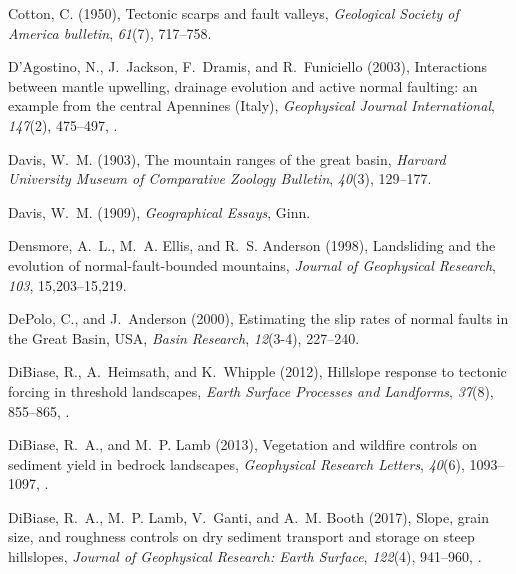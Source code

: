 \begin{thebibliography}{50}
Cotton, C. (1950), Tectonic scarps and fault valleys, \textit{Geological
  Society of America bulletin}, \textit{61}(7), 717--758.

D'Agostino, N., J.~Jackson, F.~Dramis, and R.~Funiciello (2003), {Interactions
  between mantle upwelling, drainage evolution and active normal faulting: an
  example from the central Apennines (Italy)}, \textit{Geophysical Journal
  International}, \textit{147}(2), 475--497,
  .

Davis, W.~M. (1903), The mountain ranges of the great basin, \textit{Harvard
  University Museum of Comparative Zoology Bulletin}, \textit{40}(3), 129--177.

Davis, W.~M. (1909), \textit{Geographical Essays}, Ginn.

Densmore, A.~L., M.~A. Ellis, and R.~S. Anderson (1998), Landsliding and the
  evolution of normal-fault-bounded mountains, \textit{Journal of Geophysical
  Research}, \textit{103}, 15,203--15,219.

DePolo, C., and J.~Anderson (2000), {Estimating the slip rates of normal faults
  in the Great Basin, USA}, \textit{Basin Research}, \textit{12}(3-4),
  227--240.

DiBiase, R., A.~Heimsath, and K.~Whipple (2012), Hillslope response to tectonic
  forcing in threshold landscapes, \textit{Earth Surface Processes and
  Landforms}, \textit{37}(8), 855--865, .

DiBiase, R.~A., and M.~P. Lamb (2013), Vegetation and wildfire controls on
  sediment yield in bedrock landscapes, \textit{Geophysical Research Letters},
  \textit{40}(6), 1093--1097, .

DiBiase, R.~A., M.~P. Lamb, V.~Ganti, and A.~M. Booth (2017), Slope, grain
  size, and roughness controls on dry sediment transport and storage on steep
  hillslopes, \textit{Journal of Geophysical Research: Earth Surface},
  \textit{122}(4), 941--960, .


\end{thebibliography}
